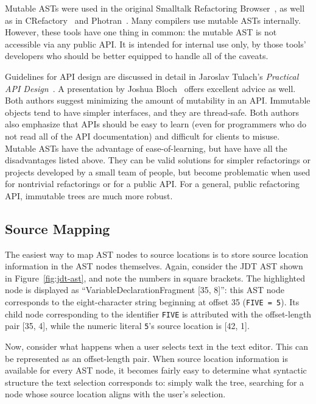 \documentclass[prodmode]{acmlarge}
\newcommand{\ttt}[1]{\texttt{#1}}
\begin{document}
Mutable ASTs were used in the original Smalltalk Refactoring
Browser~\cite{roberts97refactoring}, as well as in
CRefactory~\cite{garrido05program} and Photran~\cite{sle2008}.  Many compilers
use mutable ASTs internally.  However, these tools have one thing in common:
the mutable AST is not accessible via any public API.  It is intended for
internal use only, by those tools' developers who should be better equipped to handle all of
the caveats.

Guidelines for API design are discussed in detail in Jaroslav Tulach's
\textit{Practical API Design}~\cite{tulach08practical}.  A presentation by
Joshua Bloch~\cite{bloch} offers excellent advice as well.  Both authors
suggest minimizing the amount of mutability in an API.  Immutable objects tend
to have simpler interfaces, and they are thread-safe.  Both authors also
emphasize that APIs should be easy to learn (even for programmers who do not
read all of the API documentation) and difficult for clients to misuse. Mutable
ASTs have the advantage of ease-of-learning, but have have all the disadvantages
listed above. They can be valid solutions for simpler refactorings or projects
developed by a small team of people, but become problematic when used for 
nontrivial refactorings or for a public API. For a general, public refactoring
API, immutable trees are much more robust.


\subsection{Source Mapping}

The easiest way to map AST nodes to source locations is to store source
location information in the AST nodes themselves.  Again, consider the JDT AST
shown in Figure~\ref{fig:jdt-ast}, and note the numbers in square brackets.
The highlighted node is displayed as ``VariableDeclarationFragment [35, 8]'':
this AST node corresponds to the eight-character string beginning at offset 35
(\ttt{FIVE = 5}).  Its child node corresponding to the identifier \ttt{FIVE} is
attributed with the offset-length pair [35, 4], while the numeric literal
\ttt{5}'s source location is [42, 1].

Now, consider what happens when a user selects text in the text editor.  This
can be represented as an offset-length pair.  When source location information
is available for every AST node, it becomes fairly easy to determine what
syntactic structure the text selection corresponds to: simply
walk the tree, searching for a node whose source location aligns with the
user's selection.
\end{document}
